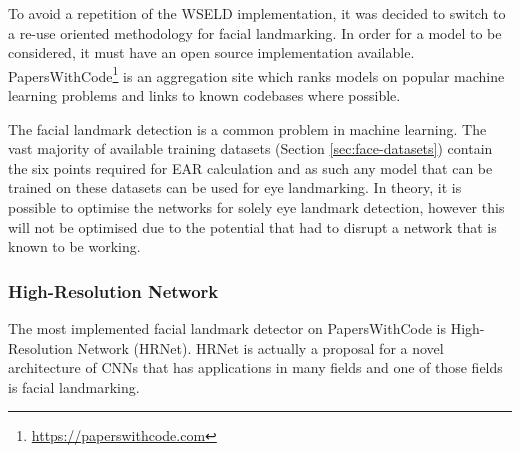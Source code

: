 
To avoid a repetition of the WSELD implementation, it was decided to switch to a re-use oriented methodology for facial landmarking. In order for a model to be considered, it must have an open source implementation available. PapersWithCode\footnote{\url{https://paperswithcode.com}} is an aggregation site which ranks models on popular machine learning problems and links to known codebases where possible. 

The facial landmark detection is a common problem in machine learning. The vast majority of available training datasets (Section \ref{sec:face-datasets}) contain the six points required for EAR calculation and as such any model that can be trained on these datasets can be used for eye landmarking. In theory, it is possible to optimise the networks for solely eye landmark detection, however this will not be optimised due to the potential that had to disrupt a network that is known to be working.

\subsubsection{High-Resolution Network}


The most implemented facial landmark detector on PapersWithCode is High-Resolution Network (HRNet)\cite{sun2019high}. HRNet is actually a proposal for a novel architecture of CNNs that has applications in many fields and one of those fields is facial landmarking.

